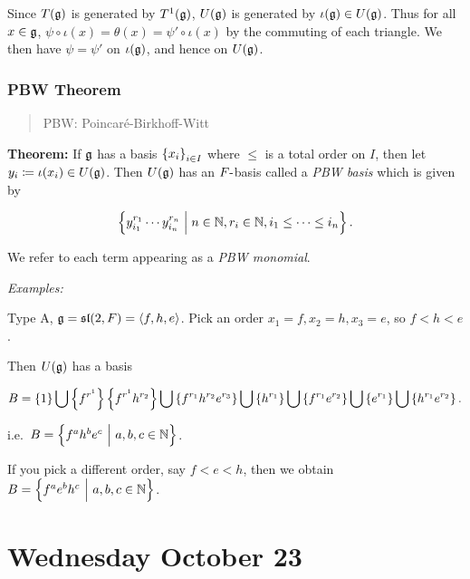 Since \(T({\mathfrak{g}})\) is generated by \(T^1({\mathfrak{g}})\), \(U({\mathfrak{g}})\) is
generated by \(\iota({\mathfrak{g}}) \in U({\mathfrak{g}})\). Thus for all \(x\in {\mathfrak{g}}\),
\(\psi\circ \iota(x) = \theta(x) = \psi' \circ \iota(x)\) by the
commuting of each triangle. We then have \(\psi = \psi'\) on
\(\iota({\mathfrak{g}})\), and hence on \(U({\mathfrak{g}})\).

\hypertarget{pbw-theorem}{%
\subsubsection{PBW Theorem}\label{pbw-theorem}}

\begin{quote}
PBW: Poincaré-Birkhoff-Witt
\end{quote}

\textbf{Theorem:} If \({\mathfrak{g}}\) has a basis \(\left\{{x_i}\right\}_{i\in I}\)
where \(\leq\) is a total order on \(I\), then let
\(y_i \coloneqq \iota(x_i) \in U({\mathfrak{g}})\). Then \(U({\mathfrak{g}})\) has an
\(F{\hbox{-}}\)basis called a \emph{PBW basis} which is given by

\begin{align*}
\left\{{ y_{i_1}^{r_1} \cdots y_{i_n}^{r_n} \mathrel{\Big|} n\in {\mathbb{N}}, r_i \in {\mathbb{N}}, i_1 \leq \cdots \leq i_n}\right\}
.\end{align*}

We refer to each term appearing as a \emph{PBW monomial}.

\emph{Examples:}

Type A, \({\mathfrak{g}} = {\mathfrak{sl}}(2, F) = \left\langle{f, h, e}\right\rangle\). Pick an order
\(x_1 = f, x_2 = h, x_3 = e\), so \(f < h < e\).

Then \(U({\mathfrak{g}})\) has a basis

\begin{align*}
B = \left\{{1}\right\} \bigcup 
\left\{{f^{r^1}}\right\} \left\{{f^{r^1} h^{r_2}}\right\} \bigcup \left\{{f^{r_1} h^{r_2} e^{r_3}}\right\} \bigcup
\left\{{h^{r_1}}\right\} \bigcup \left\{{f^{r_1}e^{r_2}}\right\} \bigcup
\left\{{e^{r_1}}\right\} \bigcup \left\{{h^{r_1} e^{r_2}}\right\}
.\end{align*}

i.e.~\(B = \left\{{f^a h^b e^c {~\mathrel{\Big|}~} a,b,c \in {\mathbb{N}}}\right\}\).

If you pick a different order, say \(f < e < h\), then we obtain
\(B = \left\{{f^a e^b h^c {~\mathrel{\Big|}~} a,b,c \in {\mathbb{N}}}\right\}\).

\hypertarget{wednesday-october-23}{%
\section{Wednesday October 23}\label{wednesday-october-23}}

